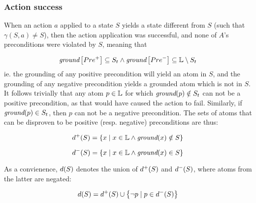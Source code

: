 \documentclass[\master/Master.tex]{subfiles}
\begin{document}
\subsubsection*{Action success}
When an action $a$ applied to a state $S$ yields a state different from $S$ (such that $\gamma (S, a) \neq S$), then the action application was successful, and none of $A$'s preconditions were violated by $S$, meaning that

        \[ \textit{ground}\left[Pre^+\right] \subseteq S_t \land
            \textit{ground}\left[Pre^-\right] \subseteq \mathbb{L} \setminus S_t
        \]
ie. the grounding of any positive precondition will yield an atom in $S$, and the grounding of any negative precondition yields a grounded atom which is not in $S$.
It follows trivially that any atom $p \in \mathbb{L}$ for which $ \textit{ground}(p) \notin S_t$ can not be a positive precondition, as that would have caused the action to fail. Similarly, if $\textit{ground}(p) \in S_t$, then $p$ can not be a negative precondition. The sets of atoms that can be disproven to be positive (resp. negative) preconditions are thus:

\begin{equation*} \label{eq:DPlusTrans}
    d^+ (S) = \left\{ x \; | \; x \in \mathbb{L} \land \textit{ground}(x) \notin S \right\}
\end{equation*}

\begin{equation*} \label{eq:DMinusTrans}
    d^- (S) = \left\{ x \; | \; x \in \mathbb{L} \land \textit{ground}(x) \in S \right\}
\end{equation*}

As a convienence, $d(S)$ denotes the union of $d^+(S)$ and $d^-(S)$, where atoms from the latter are negated:

\begin{equation*}
    d(S) = d^+ (S) \cup \left\{ \neg p \; | \; p \in d^-(S) \right\}
\end{equation*}
\end{document}
